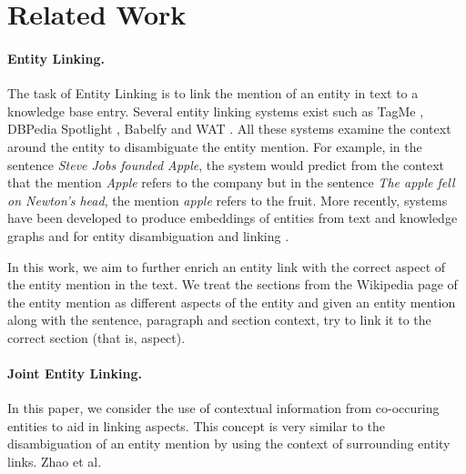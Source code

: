 \newcommand{\todo}[1]{\textcolor{red}{TODO: #1}\PackageWarning{TODO:}{#1!}}


\section{Related Work}
\label{sec:Related Work}

\paragraph{\textbf{Entity Linking.}}
The task of Entity Linking is to link the mention of an entity in text to a knowledge base entry. Several entity linking systems exist such as TagMe \cite{ferragina2010tagme}, DBPedia Spotlight \cite{mendes2011dbpedia}, Babelfy \cite{babelfy} and WAT \cite{piccinno2014wat}. All these systems examine the context around the entity to disambiguate the entity mention. 
For example, in the sentence \textit{Steve Jobs founded Apple}, the system would predict from the context that the mention \textit{Apple} refers to the company but in the sentence \textit{The apple fell on Newton's head}, the mention \textit{apple} refers to the fruit. 
More recently, systems have been developed to produce embeddings of entities from text and knowledge graphs \cite{huang2015leveraging,ristoski2016rdf2vec,yamada2016joint} and for entity disambiguation and linking \cite{yamada2017learning}. 

In this work, we aim to further enrich an entity link with the correct aspect of the entity mention in the text. We treat the sections from the Wikipedia page of the entity mention as different aspects of the entity and given an entity mention along with the sentence, paragraph and section context, try to link it to the correct section (that is, aspect).

\paragraph{\textbf{Joint Entity Linking.}} In this paper, we consider the use of contextual information from co-occuring entities to aid in linking aspects. This concept is very similar to the disambiguation of an entity mention by using the context of surrounding entity links. Zhao et al. \cite{zhao2019leveraging}

